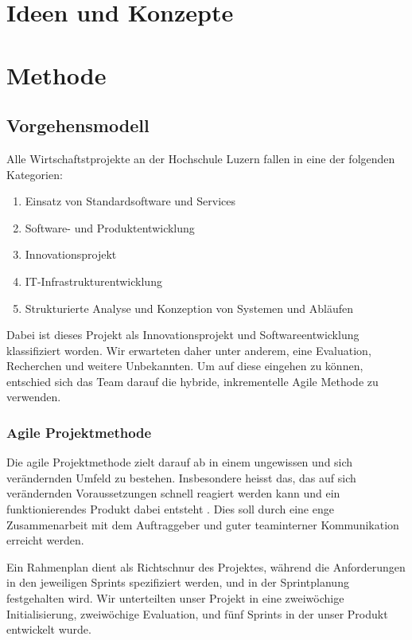 \documentclass[a4paper]{scrreprt}
\begin{document}
\chapter{Ideen und Konzepte}

\chapter{Methode}

\section{Vorgehensmodell}

Alle Wirtschaftstprojekte an der Hochschule Luzern fallen in eine der folgenden Kategorien:

\begin{enumerate}
	\item Einsatz von Standardsoftware und Services
	\item Software- und Produktentwicklung
	\item Innovationsprojekt
	\item IT-Infrastrukturentwicklung
	\item Strukturierte Analyse und Konzeption von Systemen und Abläufen
\end{enumerate}

Dabei ist dieses Projekt als Innovationsprojekt und Softwareentwicklung klassifiziert worden. Wir erwarteten daher unter anderem, eine Evaluation, Recherchen und weitere Unbekannten. Um auf diese eingehen zu können, entschied sich das Team darauf die hybride, inkrementelle Agile Methode zu verwenden.

\subsection{Agile Projektmethode}

Die agile Projektmethode zielt darauf ab in einem ungewissen und sich verändernden Umfeld zu bestehen. Insbesondere heisst das, das auf sich verändernden Voraussetzungen schnell reagiert werden kann und ein funktionierendes Produkt dabei entsteht \parencite{AgileAlliance2015}. Dies soll durch eine enge Zusammenarbeit mit dem Auftraggeber und guter teaminterner Kommunikation erreicht werden.

Ein Rahmenplan dient als Richtschnur des Projektes, während die Anforderungen in den jeweiligen Sprints spezifiziert werden, und in der Sprintplanung festgehalten wird. Wir unterteilten unser Projekt in eine zweiwöchige Initialisierung, zweiwöchige Evaluation, und fünf Sprints in der unser Produkt entwickelt wurde.
\end{document}
